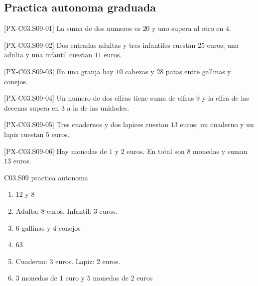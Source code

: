 \subsection*{Practica autonoma graduada}
\begin{exercise}{[PX-C03.S09-01] La suma de dos numeros es \(20\) y uno supera al otro en \(4\).}
\end{exercise}
\begin{exercise}{[PX-C03.S09-02] Dos entradas adultas y tres infantiles cuestan \(25\) euros; una adulta y una infantil cuestan \(11\) euros.}
\end{exercise}
\begin{exercise}{[PX-C03.S09-03] En una granja hay \(10\) cabezas y \(28\) patas entre gallinas y conejos.}
\end{exercise}
\begin{exercise}{[PX-C03.S09-04] Un numero de dos cifras tiene suma de cifras \(9\) y la cifra de las decenas supera en \(3\) a la de las unidades.}
\end{exercise}
\begin{exercise}{[PX-C03.S09-05] Tres cuadernos y dos lapices cuestan \(13\) euros; un cuaderno y un lapiz cuestan \(5\) euros.}
\end{exercise}
\begin{exercise}{[PX-C03.S09-06] Hay monedas de \(1\) y \(2\) euros. En total son \(8\) monedas y suman \(13\) euros.}
\end{exercise}

\begin{shortanswer}{C03.S09 practica autonoma}
\begin{enumerate}[label=\textbf{PX-C03.S09-\arabic*:}, leftmargin=*]
  \item \(12\) y \(8\)
  \item Adulta: \(8\) euros. Infantil: \(3\) euros.
  \item \(6\) gallinas y \(4\) conejos
  \item \(63\)
  \item Cuaderno: \(3\) euros. Lapiz: \(2\) euros.
  \item \(3\) monedas de \(1\) euro y \(5\) monedas de \(2\) euros
\end{enumerate}
\end{shortanswer}

